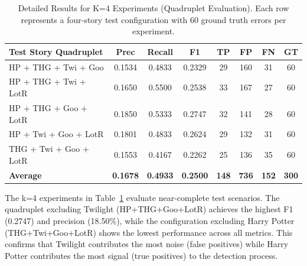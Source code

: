 \begin{table}[htbp]
\centering
\caption{Detailed Results for K=4 Experiments (Quadruplet Evaluation). Each row represents a four-story test configuration with 60 ground truth errors per experiment.}
\label{tab:k4_detailed}
\begin{tabular}{lccccccc}
\toprule
\textbf{Test Story Quadruplet} & \textbf{Prec} & \textbf{Recall} & \textbf{F1} & \textbf{TP} & \textbf{FP} & \textbf{FN} & \textbf{GT} \\
\midrule
HP + THG + Twi + Goo & 0.1534 & 0.4833 & 0.2329 & 29 & 160 & 31 & 60 \\
HP + THG + Twi + LotR & 0.1650 & 0.5500 & 0.2538 & 33 & 167 & 27 & 60 \\
HP + THG + Goo + LotR & 0.1850 & 0.5333 & 0.2747 & 32 & 141 & 28 & 60 \\
HP + Twi + Goo + LotR & 0.1801 & 0.4833 & 0.2624 & 29 & 132 & 31 & 60 \\
THG + Twi + Goo + LotR & 0.1553 & 0.4167 & 0.2262 & 25 & 136 & 35 & 60 \\
\midrule
\textbf{Average} & \textbf{0.1678} & \textbf{0.4933} & \textbf{0.2500} & \textbf{148} & \textbf{736} & \textbf{152} & \textbf{300} \\
\bottomrule
\end{tabular}
\end{table}

The k=4 experiments in Table~\ref{tab:k4_detailed} evaluate near-complete test scenarios. The quadruplet excluding Twilight (HP+THG+Goo+LotR) achieves the highest F1 (0.2747) and precision (18.50\%), while the configuration excluding Harry Potter (THG+Twi+Goo+LotR) shows the lowest performance across all metrics. This confirms that Twilight contributes the most noise (false positives) while Harry Potter contributes the most signal (true positives) to the detection process.

